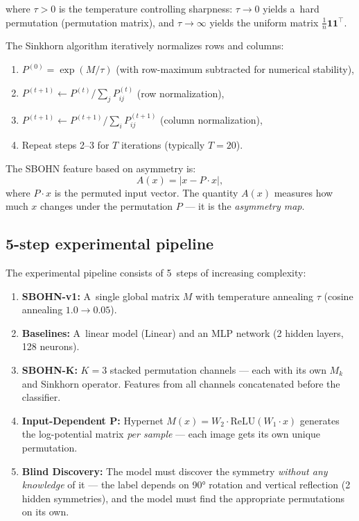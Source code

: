 \documentclass[11pt,a4paper]{report}
\begin{document}
\noindent where $\tau > 0$ is the temperature controlling sharpness: $\tau \to 0$ yields a~hard permutation (permutation matrix), and $\tau \to \infty$ yields the uniform matrix $\frac{1}{n}\mathbf{1}\mathbf{1}^\top$.

The Sinkhorn algorithm iteratively normalizes rows and columns:
\begin{enumerate}
    \item $P^{(0)} = \exp(M/\tau)$ (with row-maximum subtracted for numerical stability),
    \item $P^{(t+1)} \leftarrow P^{(t)} / \sum_j P^{(t)}_{ij}$ \quad (row normalization),
    \item $P^{(t+1)} \leftarrow P^{(t+1)} / \sum_i P^{(t+1)}_{ij}$ \quad (column normalization),
    \item Repeat steps 2--3 for $T$ iterations (typically $T=20$).
\end{enumerate}

The SBOHN feature based on asymmetry is:
\begin{equation}
A(x) = |x - P \cdot x|,
\end{equation}
\noindent where $P \cdot x$ is the permuted input vector. The quantity $A(x)$ measures how much $x$ changes under the permutation $P$ --- it is the \emph{asymmetry map}.


\subsection{5-step experimental pipeline}

The experimental pipeline consists of 5~steps of increasing complexity:

\begin{enumerate}
    \item \textbf{SBOHN-v1:} A~single global matrix $M$ with temperature annealing $\tau$ (cosine annealing $1.0 \to 0.05$).
    \item \textbf{Baselines:} A~linear model (Linear) and an MLP network (2 hidden layers, 128 neurons).
    \item \textbf{SBOHN-K:} $K=3$ stacked permutation channels --- each with its own $M_k$ and Sinkhorn operator. Features from all channels concatenated before the classifier.
    \item \textbf{Input-Dependent P:} Hypernet $M(x) = W_2 \cdot \text{ReLU}(W_1 \cdot x)$ generates the log-potential matrix \emph{per sample} --- each image gets its own unique permutation.
    \item \textbf{Blind Discovery:} The model must discover the symmetry \emph{without any knowledge} of it --- the label depends on 90° rotation and vertical reflection (2 hidden symmetries), and the model must find the appropriate permutations on its own.
\end{enumerate}
\end{document}
